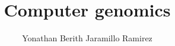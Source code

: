 \documentclass[12pt,letterpaper]{article}
\author{Yonathan Berith Jaramillo Ramirez}
\begin{document}
\title{Computer genomics}
\maketitle


\end{document}
